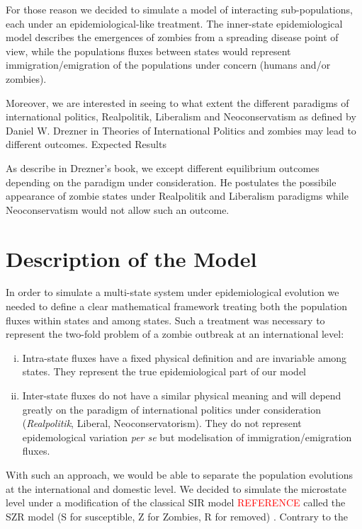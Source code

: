 \documentclass[11pt]{article} %
\begin{document}
For those reason we decided to simulate a model of interacting sub-populations, each under an epidemiological-like treatment. The inner-state epidemiological model describes the emergences of zombies from a spreading disease point of view, while the populations fluxes between states would represent immigration/emigration of the populations under concern (humans and/or zombies). 

Moreover, we are interested in seeing to what extent the different paradigms of international politics, Realpolitik, Liberalism and Neoconservatism as defined by Daniel W. Drezner in Theories of International Politics and zombies may lead to different outcomes.
Expected Results

As describe in Drezner's book, we except different equilibrium outcomes depending on the paradigm under consideration. He postulates the possibile appearance of zombie states under Realpolitik and Liberalism paradigms while Neoconservatism would not allow such an outcome.

\newpage
\section{Description of the Model}\indent

In order to simulate a multi-state system under epidemiological evolution we needed to define a clear mathematical framework treating both the population fluxes within states and among states. Such a treatment was necessary to represent the two-fold problem of a zombie outbreak at an international level:
\begin{enumerate}[i.]
	\item Intra-state fluxes have a fixed physical definition and are invariable among states. They represent the true epidemiological part of our model
	\item Inter-state fluxes do not have a similar physical meaning and will depend greatly on the paradigm of international politics under consideration (\textit{Realpolitik}, Liberal, Neoconservatorism). They do not represent epidemological variation \textit{per se} but modelisation of immigration/emigration fluxes.
\end{enumerate}

With such an approach, we would be able to separate the population evolutions at the international and domestic level. We decided to simulate the microstate level under a modification of the classical SIR model \textcolor{red}{REFERENCE} called the SZR model (S for susceptible, Z for Zombies, R for removed) \cite{munz2009zombies}. Contrary to the 
\end{document}
